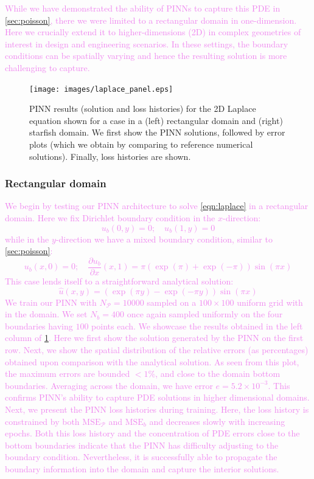 \documentclass[11pt]{article}
\newcommand{\mse}{\textrm{MSE}}
\newcommand{\pde}{\ensuremath{\mathcal{P}}}
\newcommand{\newcontent}[1]{\textcolor{violet}{#1}}
\begin{document}
\newcontent{
While we have demonstrated the ability of PINNs to capture this PDE in
\cref{sec:poisson}, there we were limited to a rectangular domain in one-dimension.
Here we crucially extend it to higher-dimensions (2D) in complex geometries
of interest in design and engineering scenarios. In these settings, the
boundary conditions can be spatially varying and hence the
resulting solution is more challenging to capture.
}

\begin{figure}[htbp]
\centering
\texttt{[image: images/laplace\_panel.eps]}
\caption{\label{fig:laplace_results}PINN results (solution and loss histories) for the 2D Laplace equation shown for a case in a (left) rectangular domain and (right) starfish domain. We first show the PINN solutions, followed by error plots (which we obtain by comparing to reference numerical solutions). Finally, loss histories are shown.}
\end{figure}

\subsubsection{Rectangular domain}
\label{sec:org227023b}
\newcontent{
We begin by testing our PINN architecture to solve \cref{eqn:laplace} in a
rectangular domain. Here we fix Dirichlet boundary condition in the
\(x\)-direction:
\[ u_b(0, y) = 0;\quad  u_b(1,  y) = 0\]
while in the \(y\)-direction we have a mixed boundary
condition, similar to \cref{sec:poisson}:
\[ u_b(x, 0) = 0 ;\quad \frac{\partial u_b}{\partial x}(x, 1) = \pi\left(
	\exp{\left(\pi\right)} + \exp{\left(-\pi\right)} \right) \sin\left( \pi x\right)\]
This case lends itself to a straightforward analytical solution:
\[
	\hat{u}(x, y) = \left(\exp{\left(\pi y\right)} - \exp{\left(-\pi y\right)} \right) \sin\left( \pi x\right)
	\]
}
\newcontent{
We train our PINN with \(N_\pde = 10000\) sampled on a \(100 \times 100\) uniform
grid with in the domain. We set \(N_b = 400\) once again sampled uniformly on
the four boundaries having \(100\) points each. We showcase the results obtained
in the left column of \cref{fig:laplace_results}. Here we first show the
solution generated by the PINN on the first row. Next, we show the spatial
distribution of the relative errors (as percentages) obtained upon
comparison with the analytical solution. As
seen from this plot, the maximum errors are bounded \(< 1\%\), and close to
the domain bottom boundaries. Averaging across the domain, we have error \(e = 5.2 \times 10^{-3}\).
This confirms PINN's ability to capture PDE
solutions in higher dimensional domains. Next, we present the PINN loss histories
during training.
Here, the loss history is constrained by both \(\mse_\pde\) and \(\mse_{b}\) and decreases slowly with increasing epochs. Both this
loss history and the concentration of PDE errors close to the bottom boundaries
indicate that the PINN has difficulty adjusting to the boundary condition.
Nevertheless, it is successfully able to propagate the boundary information
into the domain and capture the interior solutions.
}
\end{document}
